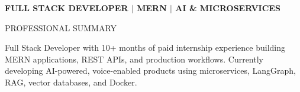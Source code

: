 \documentclass{resume}
\begin{document}
\begin{center}
\textbf{FULL STACK DEVELOPER $\vert$ MERN $\vert$ AI \& MICROSERVICES}
\end{center}
\vspace{-0.8em}


\begin{rSection}{PROFESSIONAL SUMMARY}

Full Stack Developer with 10+ months of paid internship experience building MERN applications, REST APIs, and production workflows. Currently developing AI-powered, voice-enabled products using microservices, LangGraph, RAG, vector databases, and Docker.

\end{rSection}

\end{document}
